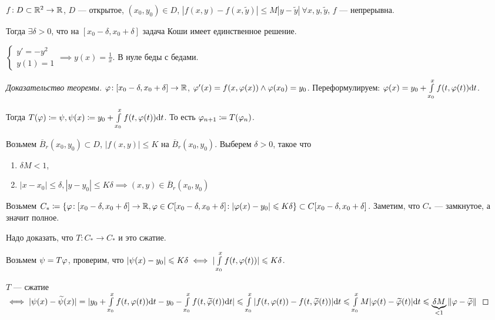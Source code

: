 \begin{theorem}[Пикара]
    $f\!: D \subset \mathbb{R}^2 \to \mathbb{R}$,  $D$ --- открытое,  $(x_0, y_0) \in D$, $|f(x, y) - f(x, \widetilde{y})| \le M |y-\widetilde{y}|\ \forall x, y, \widetilde{y}$, $f$ --- непрерывна.

    Тогда  $\exists \delta > 0$, что на  $[x_0 - \delta, x_0 + \delta]$ задача Коши имеет единственное решение.
\end{theorem}
\begin{remark}
    $\begin{cases} y' = -y^2\\y(1) = 1 \end{cases} \implies y(x) = \frac{1}{x}$. В нуле беды с бедами.
\end{remark}
\begin{proof}[Доказательство теоремы]
    $\varphi\!: [x_0-\delta, x_0 + \delta] \to \mathbb{R}$,  $\varphi'(x) = f(x, \varphi(x)) \land \varphi(x_0) = y_0$. Переформулируем: $\varphi(x) = y_0 + \int\limits_{x_0}^x f(t, \varphi(t)) \mathrm{d}t$.

    Тогда $T(\varphi) \coloneqq \psi, \psi(x) \coloneqq y_0 + \int\limits_{x_0}^x f(t, \varphi(t)) \mathrm{d}t$. То есть $\varphi_{n+1} \coloneqq T(\varphi_n)$.

    Возьмем  $\overline{B}_r(x_0, y_0) \subset D$,  $|f(x, y)| \le K$ на $\overline{B}_r(x_0, y_0)$. Выберем $\delta > 0$, такое что 
    \begin{enumerate}
        \item $\delta M < 1$,
        \item  $|x - x_0| \le \delta, |y-y_0| \le K\delta \implies (x, y) \in \overline{B}_r(x_0, y_0)$
    \end{enumerate}
    Возьмем $C_* \coloneqq \{ \varphi\!: [x_0 -\delta, x_0 + \delta] \to \mathbb{R}, \varphi \in C[x_0 - \delta, x_0 + \delta]\!: |\varphi(x) - y_0| \leqslant K\delta\} \subset C[x_0-\delta, x_0 + \delta]$. Заметим, что $C_*$ --- замкнутое, а значит полное.

    Надо доказать, что $T\!: C_* \to C_*$ и это сжатие.

    Возьмем $\psi = T\varphi$, проверим, что $|\psi(x) - y_0| \leqslant K\delta \iff |\int\limits_{x_0}^x f(t, \varphi(t))| \leqslant K\delta$.

    $T$ --- сжатие  $ \iff |\psi(x) - \widetilde{\psi}(x)| = |y_0 + \int\limits_{x_0}^x f(t, \varphi(t))\mathrm{d}t - y_0 -\int\limits_{x_0}^x f(t, \widetilde{\varphi}(t)) \mathrm{d}t| \leqslant \int\limits_{x_0}^x |f(t, \varphi(t)) - f(t, \widetilde{\varphi}(t))| \mathrm{d}t \leqslant \int\limits_{x_0}^x M|\varphi(t) - \widetilde{\varphi}(t)|\mathrm{d}t \leqslant \underbrace{\delta M}_{< 1} \|\varphi - \widetilde{\varphi}\|$
\end{proof}
